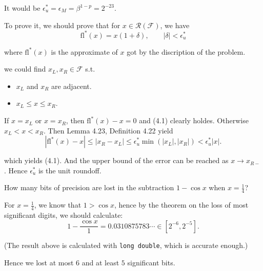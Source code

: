 \documentclass[11pt]{elegantbook}
\begin{document}
\begin{solution}
  It would be $\epsilon_u^*=\epsilon_M=\beta^{1-p}=2^{-23}$.
  
  To prove it, we should prove that for $x\in\mathcal{R(F)}$, we have
  \begin{equation}
    \text{fl}^*(x)=x(1+\delta), \qquad |\delta|<\epsilon_u^*
  \end{equation}

  where $\text{fl}^*(x)$ is the approximate of $x$ got by the discription of the problem.

  we could find $x_L,x_R\in\mathcal{F}$ s.t.

  \begin{itemize}
    \item $x_L$ and $x_R$ are adjacent.
    \item $x_L\leq x\leq x_R$.
  \end{itemize}

  If $x=x_L$ or $x=x_R$, then $\text{fl}^*(x)-x=0$ and (4.1) clearly holdes. Otherwise $x_L<x<x_R$. Then Lemma 4.23, Definition 4.22 yield
  \begin{equation*}
    |\text{fl}^*(x)-x|\leq |x_R-x_L|\leq \epsilon_u^*\min(|x_L|,|x_R|)< \epsilon_u^*|x|.
  \end{equation*}

  which yields (4.1). And the upper bound of the error can be reached as $x\to x_{R-}$. Hence $\epsilon_u^*$ is the unit roundoff.
\end{solution}

\vspace{1em}

\begin{problem}
  How many bits of precision are lost in the subtraction $1-\cos x$ when $x=\frac{1}{4}$?
\end{problem}

\begin{solution}
  For $x=\frac{1}{4}$, we know that $1>\cos x$, hence by the theorem on the loss of most significant digits, we should calculate:
  \begin{equation*}
    1-\frac{\cos x}{1}=0.0310875783\cdots \in [2^{-6},2^{-5}].
  \end{equation*}
  
  (The result above is calculated with \verb|long double|, which is accurate enough.)

  Hence we lost at most $6$ and at least $5$ significant bits.
\end{solution}
\end{document}

